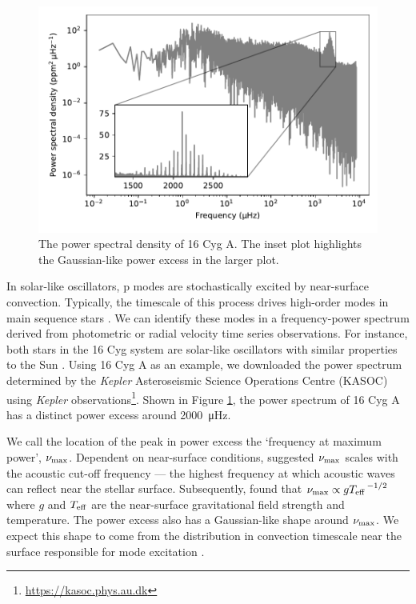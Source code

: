 \begin{figure}[tb]
    \centering
    \includegraphics{figures/seismo-psd.pdf}
    \caption{The power spectral density of 16 Cyg A. The inset plot highlights the Gaussian-like power excess in the larger plot.}
    \label{fig:seismo-psd}
\end{figure}

In solar-like oscillators, p modes are stochastically excited by near-surface convection. Typically, the timescale of this process drives high-order modes in main sequence stars \needcite[\(n \sim 20\)]. We can identify these modes in a frequency-power spectrum derived from photometric or radial velocity time series observations. For instance, both stars in the 16 Cyg system are solar-like oscillators with similar properties to the Sun \needcite. Using 16 Cyg A as an example, we downloaded the power spectrum determined by the \emph{Kepler} Asteroseismic Science Operations Centre (KASOC) using \emph{Kepler} observations\footnote{\url{https://kasoc.phys.au.dk}}. Shown in Figure \ref{fig:seismo-psd}, the power spectrum of 16 Cyg A has a distinct power excess around \SI{2000}{\micro\hertz}. 

We call the location of the peak in power excess the `frequency at maximum power', \({\nu_\mathrm{max}}\). Dependent on near-surface conditions, \citet{Brown.Gilliland.ea1991} suggested \({\nu_\mathrm{max}}\) scales with the acoustic cut-off frequency --- the highest frequency at which acoustic waves can reflect near the stellar surface. Subsequently, \citet{Kjeldsen.Bedding1995} found that \({\nu_\mathrm{max}} \propto g{T_\mathrm{eff}}^{\,-1/2}\) where \(g\) and \({T_\mathrm{eff}}\) are the near-surface gravitational field strength and temperature. The power excess also has a Gaussian-like shape around \({\nu_\mathrm{max}}\). We expect this shape to come from the distribution in convection timescale near the surface responsible for mode excitation \needcite.

